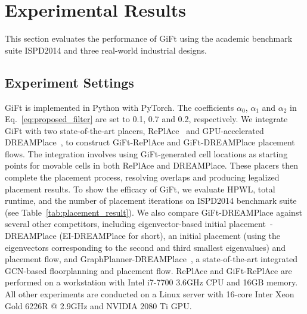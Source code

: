 \section{Experimental Results} \label{sec:experiment}
This section evaluates the performance of GiFt using the academic benchmark suite ISPD2014 and three real-world industrial designs.

\subsection{Experiment Settings}
GiFt is implemented in Python with PyTorch. 
The coefficients $\alpha_0$, $\alpha_1$ and $\alpha_2$ in Eq.~\ref{eq:proposed_filter} are set to 0.1, 0.7 and 0.2, respectively.
We integrate GiFt with two state-of-the-art placers, RePlAce~\cite{replace} and GPU-accelerated DREAMPlace~\cite{dreamplace3}, to construct GiFt-RePlAce and GiFt-DREAMPlace placement flows.
The integration involves using GiFt-generated cell locations as starting points for movable cells in both RePlAce and DREAMPlace. These placers then complete the placement process, resolving overlaps and producing legalized placement results.
To show the efficacy of GiFt, we evaluate HPWL, total runtime, and the number of placement iterations on ISPD2014 benchmark suite~\cite{ispd2014} (see Table~\ref{tab:placement_result}). 
We also compare GiFt-DREAMPlace against several other competitors, including eigenvector-based initial placement~\cite{eigen_placer}-DREAMPlace (EI-DREAMPlace for short), an initial placement (using the eigenvectors corresponding to the second and third smallest eigenvalues) and placement flow, and GraphPlanner-DREAMPlace~\cite{graphplanner}, a state-of-the-art integrated GCN-based floorplanning and placement flow. 
RePlAce and GiFt-RePlAce are performed on a workstation with Intel i7-7700 3.6GHz CPU and 16GB memory. All other experiments are conducted on a Linux server with 16-core Inter Xeon Gold 6226R @ 2.9GHz and NVIDIA 2080 Ti GPU.



